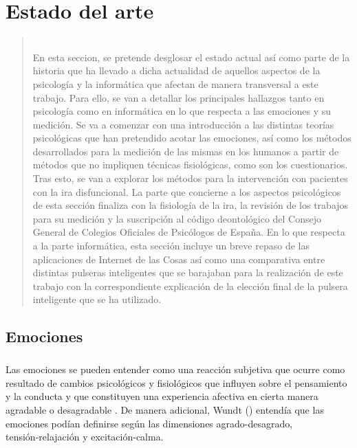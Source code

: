 %
%

\chapter{Estado del arte}

\begin{quotation}\noindent\begin{small}\textbf{} \\
En esta seccion, se pretende desglosar el estado actual así como parte de la historia que ha llevado a dicha actualidad de aquellos aspectos de la psicología y la informática que afectan de manera transversal a este trabajo. Para ello, se van a detallar los principales hallazgos tanto en psicología como en informática en lo que respecta a las emociones y su medición. Se va a comenzar con una introducción a las distintas teorías psicológicas que han pretendido acotar las emociones, así como los métodos desarrollados para la medición de las mismas en los humanos a partir de métodos que no impliquen técnicas fisiológicas, como son los cuestionarios. Tras esto, se van a explorar los métodos para la intervención con pacientes con la ira disfuncional. La parte que concierne a los aspectos psicológicos de esta sección finaliza con la fisiología de la ira, la revisión de los trabajos para su medición y la suscripción al código deontológico del Consejo General de Colegios Oficiales de Psicólogos de España. En lo que respecta a la parte informática, esta sección incluye un breve repaso de las aplicaciones de Internet de las Cosas así como una comparativa entre distintas pulseras inteligentes que se barajaban para la realización de este trabajo con la correspondiente explicación de la elección final de la pulsera inteligente que se ha utilizado.
\end{small}\end{quotation}


\section{Emociones}
\label{cap1:sec:Emociones}

\paragraph{}
Las emociones se pueden entender como una reacción subjetiva que ocurre como resultado de cambios psicológicos y fisiológicos que influyen sobre el pensamiento y la conducta \citep{psicoemocional} y que constituyen una experiencia afectiva en cierta manera agradable o desagradable \citep{montanes2005psicologia}. De manera adicional, Wundt (\citeyear{wundt1896lectures}) entendía que las emociones podían definirse según las dimensiones agrado-desagrado, \\ tensión-relajación y excitación-calma.

